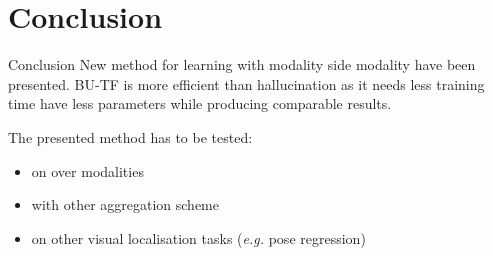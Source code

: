 \section{Conclusion}

\label{subsec:conlusion}

\begin{frame}{Conclusion}
	\vfill
	New method for learning with modality side modality have been presented. BU-TF is more efficient than hallucination as it needs less training time have less parameters while producing comparable results.
	\vfill
	\uncover<2->
	{
		The presented method has to be tested:
		\begin{itemize}
			\item<3-> on over modalities
			\item<4-> with other aggregation scheme
			\item<5-> on other visual localisation tasks (\textit{e.g.} pose regression)
		\end{itemize}
	}
	\vfill
\end{frame}